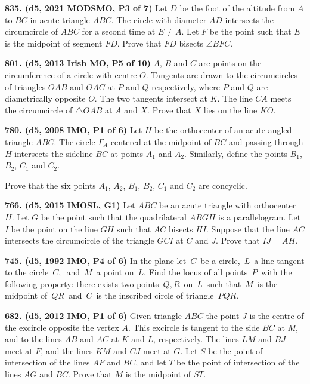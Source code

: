 \documentclass{article}
\begin{document}
\textbf{835. (\color{red}d5\color{black}, 2021 MODSMO, P3 of 7)} Let $D$ be the foot of the altitude from $A$ to $BC$ in acute triangle $A B C.$ The circle with diameter $A D$ intersects the circumcircle of $A B C$ for a second time at $E \neq A.$ Let $F$ be the point such that $E$ is the midpoint of segment $FD$. Prove that $FD$ bisects $\angle B F C$.

\textbf{801. (\color{red}d5\color{black}, 2013 Irish MO, P5 of 10)} $A$, $B$ and $C$ are points on the circumference of a circle with centre $O$. Tangents are drawn to the circumcircles of triangles $OAB$ and $OAC$ at $P$ and $Q$ respectively, where $P$ and $Q$ are diametrically opposite $O$. The two tangents intersect at $K$. The line $CA$ meets the circumcircle of $\triangle OAB$ at $A$ and $X$. Prove that $X$ lies on the line $KO$.

\textbf{780. (\color{red}d5\color{black}, 2008 IMO, P1 of 6)} Let $ H$ be the orthocenter of an acute-angled triangle $ ABC$. The circle $ \Gamma_{A}$ centered at the midpoint of $ BC$ and passing through $ H$ intersects the sideline $ BC$ at points $ A_{1}$ and $ A_{2}$. Similarly, define the points $ B_{1}$, $ B_{2}$, $ C_{1}$ and $ C_{2}$.

Prove that the six points $ A_{1}$, $ A_{2}$, $ B_{1}$, $ B_{2}$, $ C_{1}$ and $ C_{2}$ are concyclic.

\textbf{766. (\color{red}d5\color{black}, 2015 IMOSL, G1)} Let $ABC$ be an acute triangle with orthocenter $H$. Let $G$ be the point such that the quadrilateral $ABGH$ is a parallelogram. Let $I$ be the point on the line $GH$ such that $AC$ bisects $HI$. Suppose that the line $AC$ intersects the circumcircle of the triangle $GCI$ at $C$ and $J$. Prove that $IJ = AH$.

\textbf{745. (\color{red}d5\color{black}, 1992 IMO, P4 of 6)} In the plane let $\,C\,$ be a circle, $\,L\,$ a line tangent to the circle $\,C,\,$ and $\,M\,$ a point on $\,L$. Find the locus of all points $\,P\,$ with the following property: there exists two points $\,Q,R\,$ on $\,L\,$ such that $\,M\,$ is the midpoint of $\,QR\,$ and $\,C\,$ is the inscribed circle of triangle $\,PQR$.

\textbf{682. (\color{red}d5\color{black}, 2012 IMO, P1 of 6)} Given triangle $ABC$ the point $J$ is the centre of the excircle opposite the vertex $A.$ This excircle is tangent to the side $BC$ at $M$, and to the lines $AB$ and $AC$ at $K$ and $L$, respectively. The lines $LM$ and $BJ$ meet at $F$, and the lines $KM$ and $CJ$ meet at $G.$ Let $S$ be the point of intersection of the lines $AF$ and $BC$, and let $T$ be the point of intersection of the lines $AG$ and $BC.$ Prove that $M$ is the midpoint of $ST.$
\end{document}
